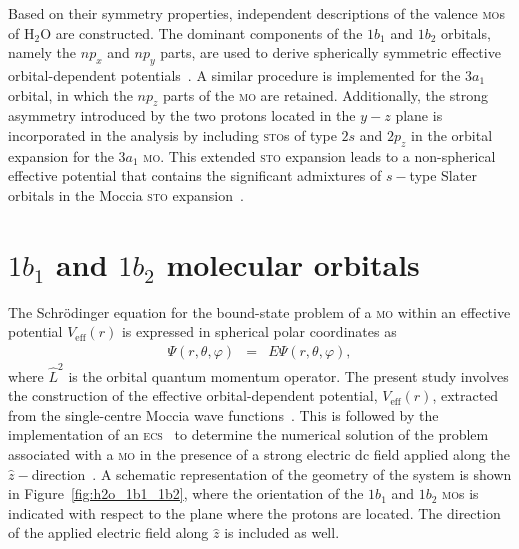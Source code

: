 Based on their symmetry properties, independent descriptions of the
valence \textsc{mo}s of H$_{2}$O are constructed. The dominant
components of the $1b_{1}$ and $1b_{2}$ orbitals, namely the $np_{x}$
and $np_{y}$ parts, are used to derive spherically symmetric effective
orbital-dependent potentials~\cite{sarias_2016}. A similar procedure
is implemented for the $3a_{1}$ orbital, in which the $np_{z}$ parts
of the \textsc{mo} are retained. Additionally, the strong asymmetry
introduced by the two protons located in the $y-z$ plane is
incorporated in the analysis by including \textsc{sto}s of type $2s$
and $2p_{z}$ in the orbital expansion for the $3a_{1}$
\textsc{mo}. This extended \textsc{sto} expansion leads to a
non-spherical effective potential that contains the significant
admixtures of $s-$type Slater orbitals in the Moccia \textsc{sto}
expansion~\cite{Moccia_1964}.
 



\section{$1b_{1}$ and $1b_{2}$ molecular orbitals}
\label{ch:1b1_1b2}

The Schr\"{o}dinger equation for the bound-state problem of a
\textsc{mo} within an effective potential $V_{\mathrm{eff}}(r)$ is
expressed in spherical polar coordinates as
%
\begin{eqnarray}
  [ -\frac{1}{2} (\frac{\partial^{2}}{\partial r^{2}} +
    \frac{2}{r} \frac{\partial}{\partial r}) +
    \frac{\hat{L}^2}{2r^2} + V_{\rm{eff}}(r) ] \Psi(r,\theta,\varphi)
  & = & E\Psi(r,\theta,\varphi),
\label{eq:sch_noCS}
\end{eqnarray}
%
where $\hat{L}^{2}$ is the orbital quantum momentum operator. The
present study involves the construction of the effective
orbital-dependent potential, $V_{\mathrm{eff}}(r)$, extracted from the
single-centre Moccia wave functions~\cite{Moccia_1964}. This is
followed by the implementation of an \textsc{ecs}~\cite{Simon_1979} to
determine the numerical solution of the problem associated with a
\textsc{mo} in the presence of a strong electric dc field applied
along the $\hat{z}-$direction~\cite{sarias_2016}. A schematic
representation of the geometry of the system is shown in
Figure~\ref{fig:h2o_1b1_1b2}, where the orientation of the $1b_{1}$
and $1b_{2}$ \textsc{mo}s is indicated with respect to the plane where
the protons are located. The direction of the applied electric field
along $\hat{z}$ is included as well.


